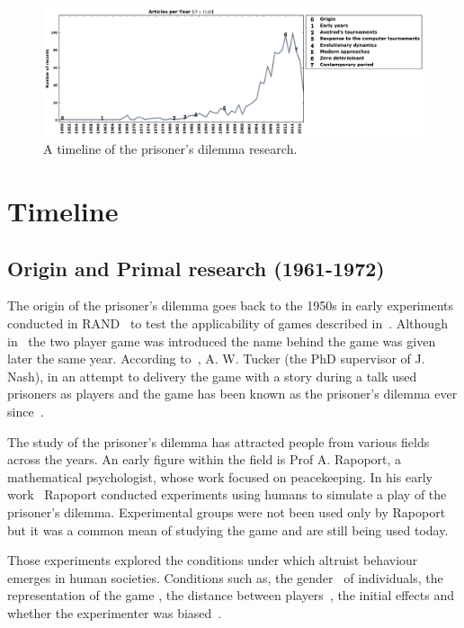 \documentclass{article}
\theoremstyle{definition}
\begin{document}
\begin{figure}[!htbp]
    \centering
    \includegraphics[width=\textwidth]{assets/images/timeline.pdf}
    \caption{\label{fig:timeline} A timeline of the prisoner's dilemma research.}
\end{figure}

\section{Timeline}\label{section:timeline}

\subsection{Origin and Primal research (1961-1972)}

The origin of the prisoner's dilemma goes back to the 1950s in early experiments
conducted in RAND~\cite{Flood1958} to test the applicability of games
described in~\cite{VonNeumann1944}. Although in~\cite{Flood1958} the two player
game was introduced the name behind the game was given later the same year.
According to~\cite{Tucker1983}, A. W. Tucker (the PhD supervisor of J. Nash),
in an attempt to delivery the game with a story during a talk used prisoners as
players and the game has been known as the prisoner's dilemma ever since~\cite{Tucker1983}.

The study of the prisoner's dilemma has attracted people from various fields
across the years. An early figure within the field is Prof A. Rapoport,
a mathematical psychologist, whose work focused on peacekeeping.
In his early work~\cite{rapoport1965} Rapoport conducted experiments using humans
to simulate a play of the prisoner's dilemma. Experimental groups were not been
used only by Rapoport but it was a common mean of studying the game
\cite{Evans1966, Gallo1968, Lutzker1961, Mack1971, Sensenig1972} and are still
being used today. %

Those experiments explored the conditions under which altruist behaviour emerges
in human societies. Conditions such as, the gender~\cite{Evans1966,
Lutzker1961, Mack1971} of individuals, the representation of the game
\cite{Evans1966}, the distance between players~\cite{Sensenig1972}, the initial effects
\cite{Tedeschi1968} and whether the experimenter was biased~\cite{Gallo1968}.
\end{document}

